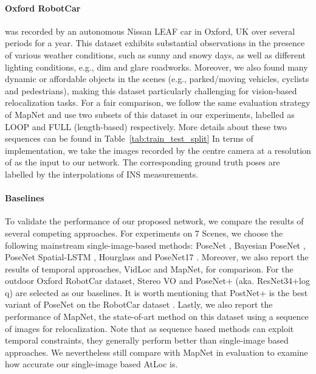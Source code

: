 \documentclass[letterpaper]{article}
\begin{document}
\paragraph{Oxford RobotCar} \cite{maddern20171}
was recorded by an autonomous Nissan LEAF car in Oxford, UK over several periods for a year. This dataset exhibits substantial observations in the presence of various weather conditions, such as sunny and snowy days, as well as different lighting conditions, e.g., dim and glare roadworks. Moreover, we also found many dynamic or affordable objects in the scenes (e.g., parked/moving vehicles, cyclists and pedestrians), making this dataset particularly challenging for vision-based relocalization tasks. For a fair comparison, we follow the same evaluation strategy of MapNet \cite{brahmbhatt2018geometry,xue2019local} and use two subsets of this dataset in our experiments, labelled as LOOP and FULL (length-based) respectively. More details about these two sequences can be found in Table~\ref{tab:train_test_split}
In terms of implementation, we take the images recorded by the centre camera at a resolution of  as the input to our network. The corresponding ground truth poses are labelled by the interpolations of INS measurements.

\paragraph{Baselines}
To validate the performance of our proposed network, we compare the results of several competing approaches. For experiments on 7 Scenes, we choose the following mainstream single-image-based methods: PoseNet \cite{kendall2015posenet}, Bayesian PoseNet \cite{kendall2016modelling}, PoseNet Spatial-LSTM \cite{walch2017image}, Hourglass\cite{melekhov2017image} and PoseNet17 \cite{kendall2017geometric}. Moreover, we also report the results of temporal approaches, VidLoc\cite{clark2017vidloc} and MapNet, for comparison. For the outdoor Oxford RobotCar dataset, Stereo VO \cite{maddern20171} and PoseNet+ (aka. ResNet34+log q) \cite{brahmbhatt2018geometry} are selected as our baselines. It is worth mentioning that PostNet+ is the best variant of PoseNet \cite{kendall2015posenet} on the RobotCar dataset \cite{brahmbhatt2018geometry}. Lastly, we also report the performance of MapNet\cite{brahmbhatt2018geometry}, the state-of-art method on this dataset using a sequence of images for relocalization. Note that as sequence based methods can exploit temporal constraints, they generally perform better than single-image based approaches. We nevertheless still compare with MapNet in evaluation to examine how accurate our single-image based AtLoc is.
\end{document}
